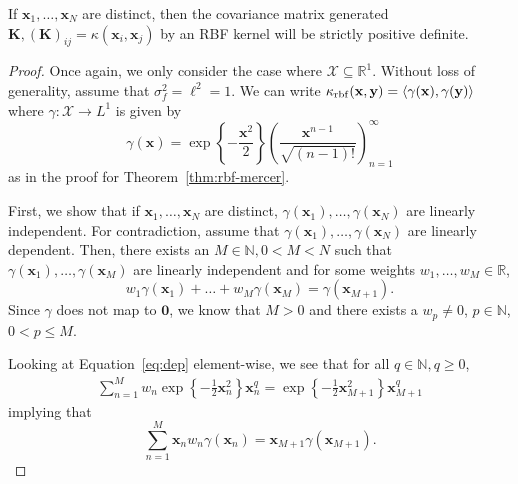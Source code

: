 \begin{lemma}
    \label{lem:rbf-pd}
    If $\mathbf{x}_1, \dots, \mathbf{x}_N$ are distinct, then the covariance matrix generated $\mathbf{K}, (\mathbf{K})_{ij} = \kappa(\mathbf{x}_i, \mathbf{x}_j)$ by an RBF kernel will be strictly positive definite.
\end{lemma}
\begin{proof}
    Once again, we only consider the case where $\mathcal{X} \subseteq \mathbb{R}^{1}$.
    Without loss of generality, assume that $\sigma_f^2 = \ell^2 = 1$.
    We can write $\kappa_{\mathrm{rbf}}(\mathbf{x}, \mathbf{y}) = \langle \gamma(\mathbf{x}), \gamma(\mathbf{y}) \rangle$
    where $\gamma: \mathcal{X} \to L^{1}$ is given by
    \begin{equation*}
        \gamma(\mathbf{x}) = \exp\left\{-\frac{\mathbf{x}^2}2 \right\} \left(\frac{ \mathbf{x}^{n - 1} }{ \sqrt{(n - 1)!} }\right)_{n=1}^{\infty}
    \end{equation*}
    as in the proof for Theorem~\ref{thm:rbf-mercer}.

    First, we show that if $\mathbf{x}_1, \dots, \mathbf{x}_N$ are distinct, $\gamma(\mathbf{x}_1), \dots, \gamma(\mathbf{x}_N)$ are linearly independent.
    For contradiction, assume that $\gamma(\mathbf{x}_1), \dots, \gamma(\mathbf{x}_N)$ are linearly dependent.
    Then, there exists an $M \in \mathbb{N}, 0 < M < N$ such that $\gamma(\mathbf{x}_1), \dots, \gamma(\mathbf{x}_M)$
    are linearly independent and for some weights $w_1, \dots, w_M \in \mathbb{R}$,
    \begin{equation}
        \label{eq:dep}
        w_1 \gamma(\mathbf{x}_1) + \dots + w_M \gamma(\mathbf{x}_M) = \gamma(\mathbf{x}_{M + 1}).
    \end{equation}
    Since $\gamma$ does not map to $\mathbf{0}$, we know that $M > 0$ and there exists a $w_p \neq 0$, $p \in \mathbb{N}$, $0 < p \leq M$.

    Looking at Equation~\ref{eq:dep} element-wise, we see that for all $q \in \mathbb{N}, q \geq 0$,
    \begin{align*}
        \sum\limits_{n = 1}^{M} w_n \exp \left\{ -\frac12 \mathbf{x}_n^2 \right\} \mathbf{x}_n^{q}
        = \exp \left\{ -\frac12 \mathbf{x}_{M + 1}^2 \right\} \mathbf{x}_{M+1}^{q}
    \end{align*}
    implying that
    \begin{equation*}
        \sum\limits_{n=1}^{M} \mathbf{x}_n w_n \gamma(\mathbf{x}_n)  = \mathbf{x}_{M + 1} \gamma(\mathbf{x}_{M + 1}).
    \end{equation*}


\end{proof}
